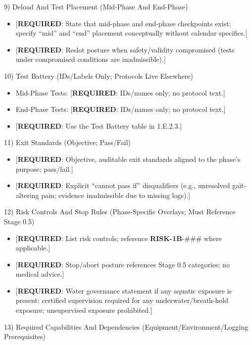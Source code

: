 \documentclass[10pt]{article}
\begin{document}
9) Deload And Test Placement (Mid-Phase And End-Phase)

\begin{itemize}
\item {[\textbf{REQUIRED}: State that mid-phase and end-phase checkpoints exist; specify “mid” and “end” placement conceptually without calendar specifics.]}
\item {[\textbf{REQUIRED}: Reslot posture when safety/validity compromised (tests under compromised conditions are inadmissible).]}
\end{itemize}

10) Test Battery (IDs/Labels Only; Protocols Live Elsewhere)

\begin{itemize}
\item Mid-Phase Tests: [\textbf{REQUIRED}: IDs/names only; no protocol text.]
\item End-Phase Tests: [\textbf{REQUIRED}: IDs/names only; no protocol text.]
\item {[\textbf{REQUIRED}: Use the Test Battery table in 1.E.2.3.]}
\end{itemize}

11) Exit Standards (Objective; Pass/Fail)

\begin{itemize}
\item {[\textbf{REQUIRED}: Objective, auditable exit standards aligned to the phase’s purpose; pass/fail.]}
\item {[\textbf{REQUIRED}: Explicit “cannot pass if” disqualifiers (e.g., unresolved gait-altering pain; evidence inadmissible due to missing logs).]}
\end{itemize}

12) Risk Controls And Stop Rules (Phase-Specific Overlays; Must Reference Stage 0.5)

\begin{itemize}
\item {[\textbf{REQUIRED}: List risk controls; reference \textbf{RISK-1B}-\#\#\# where applicable.]}
\item {[\textbf{REQUIRED}: Stop/abort posture references Stage 0.5 categories; no medical advice.]}
\item {[\textbf{REQUIRED}: Water governance statement if any aquatic exposure is present: certified supervision required for any underwater/breath-hold exposure; unsupervised exposure prohibited.]}
\end{itemize}

13) Required Capabilities And Dependencies (Equipment/Environment/Logging Prerequisites)
\end{document}
